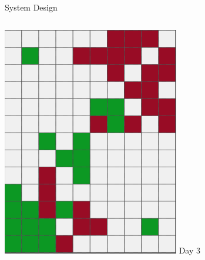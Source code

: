 \documentclass[9pt]{beamer}
\begin{document}
\begin{frame}{System Design}
\begin{columns}
\begin{column}{0.33\textwidth}
\begin{columns}
\begin{column}{0.5\textwidth}
\begin{center}
                        \includegraphics[width=\textwidth,trim={0cm 0cm 0cm 0cm},clip]{img/analyst3.png}
                        \newline
                        Day 3
                    \end{center}
                \end{column}
                \begin{column}{0.5\textwidth}
                    \begin{center}

\end{center}
\end{column}
\end{columns}
\end{column}
\end{columns}
\end{frame}
\end{document}
